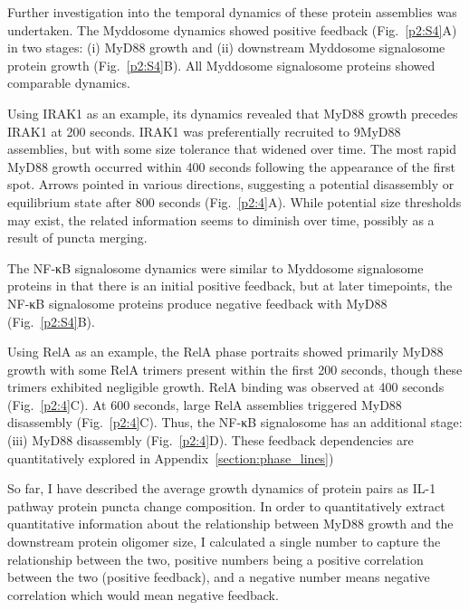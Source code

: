 Further investigation into the temporal dynamics of these protein assemblies was undertaken. The Myddosome dynamics showed positive feedback (Fig.~\ref{p2:S4}A) in two stages: (i) MyD88 growth and (ii) downstream Myddosome signalosome protein growth (Fig.~\ref{p2:S4}B). All Myddosome signalosome proteins showed comparable dynamics.

Using IRAK1 as an example, its dynamics revealed that MyD88 growth precedes IRAK1 at 200 seconds. IRAK1 was preferentially recruited to 9\times MyD88 assemblies, but with some size tolerance that widened over time. The most rapid MyD88 growth occurred within 400 seconds following the appearance of the first spot. Arrows pointed in various directions, suggesting a potential disassembly or equilibrium state after 800 seconds (Fig.~\ref{p2:4}A). While potential size thresholds may exist, the related information seems to diminish over time, possibly as a result of puncta merging.

The NF-κB signalosome dynamics were similar to Myddosome signalosome proteins in that there is an initial positive feedback, but at later timepoints, the NF-κB signalosome proteins produce negative feedback with MyD88 (Fig.~\ref{p2:S4}B).

Using RelA as an example, the RelA phase portraits showed primarily MyD88 growth with some RelA trimers present within the first 200 seconds, though these trimers exhibited negligible growth. RelA binding was observed at 400 seconds (Fig.~\ref{p2:4}C). At 600 seconds, large RelA assemblies triggered MyD88 disassembly (Fig.~\ref{p2:4}C). Thus, the NF-κB signalosome has an additional stage: (iii) MyD88 disassembly (Fig.~\ref{p2:4}D). These feedback dependencies are quantitatively explored in Appendix~\ref{section:phase_lines})

So far, I have described the average growth dynamics of protein pairs as IL-1 pathway protein puncta change composition. In order to quantitatively extract quantitative information about the relationship between MyD88 growth and the downstream protein oligomer size, I calculated a single number to capture the relationship between the two, positive numbers being a positive correlation between the two (positive feedback), and a negative number means negative correlation which would mean negative feedback.


